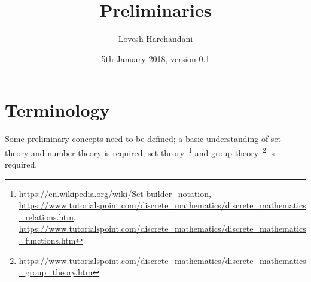\documentclass[a4paper]{article}
\title{Preliminaries}
\author{Lovesh Harchandani}
\date{5th January 2018, version 0.1}
\begin{document}
\maketitle

\section{Terminology}

Some preliminary concepts need to be defined; a basic understanding of set theory and number theory is required, set theory~\footnote{\url{https://en.wikipedia.org/wiki/Set-builder_notation}, \url{https://www.tutorialspoint.com/discrete_mathematics/discrete_mathematics_relations.htm}, \url{https://www.tutorialspoint.com/discrete_mathematics/discrete_mathematics_functions.htm}} and group theory~\footnote{\url{https://www.tutorialspoint.com/discrete_mathematics/discrete_mathematics_group_theory.htm}} is required. 
\newline
\end{document}
